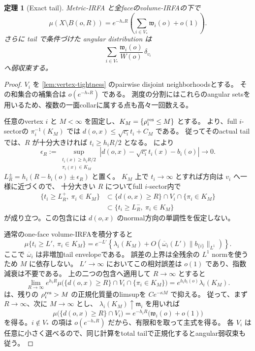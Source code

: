 \documentclass[11pt,a4paper]{ltjsarticle}
\theoremstyle{plain}
\newtheorem{theorem}{定理}[section]
\theoremstyle{definition}
\theoremstyle{remark}
\begin{document}
\begin{theorem}[Exact tail]
\label{thm:tail}
Metric-IRFA と全faceのvolume-IRFAの下で
\[
 \boxed{
 \mu(X\setminus B(o,R))
 =e^{-h_*R}\left(\sum_{i\in V_*}\mathfrak w_i(o)+o(1)\right).}
\]
さらに tail で条件づけた angular distribution は
\[
 \sum_{i\in V_*}
 \frac{\mathfrak w_i(o)}{W(o)}\,\delta_{v_i}
\]
へ弱収束する。
\end{theorem}
\begin{proof}
$V_i$ を \cref{lem:vertex-tightness} のpairwise disjoint neighborhoodsとする。
その和集合の補集合は $o(e^{-h_*R})$ である。
測度の分割にはこれらのangular setsを用いるため、複数の一面collarに属する点も高々一回数える。

任意のvertex $i$ と $M<\infty$ を固定し、$K_M=\{\rho_i^{\rm res}\le M\}$ とする。
 より、full $i$-sectorの $\pi_i^{-1}(K_M)$ では
$d(o,x)\le\sqrt{c_i}t_i+C_M$ である。
従ってそのactual tailでは、$R$ が十分大きければ $t_i\ge h_iR/2$ となる。
 により
\[
 \epsilon_R:=
 \sup_{\substack{t_i(x)\ge h_iR/2\\\pi_i(x)\in K_M}}
 \left|d(o,x)-\sqrt{c_i}t_i(x)-b_i(o)\right|
 \longrightarrow0.
\]
$L_R^\pm=h_i(R-b_i(o)\pm\epsilon_R)$ と置く。
$K_M$ 上で $t_i\to\infty$ とすれば方向は $v_i$ へ一様に近づくので、
十分大きい $R$ についてfull $i$-sector内で
\begin{align*}
 \{t_i\ge L_R^+,\ \pi_i\in K_M\}
 &\subset \{d(o,x)\ge R\}\cap V_i\cap\{\pi_i\in K_M\}\\
 &\subset \{t_i\ge L_R^-,\ \pi_i\in K_M\}
\end{align*}
が成り立つ。この包含には $d(o,x)$ のnormal方向の単調性を仮定しない。

通常のone-face volume-IRFAを積分すると
\[
 \mu\{t_i\ge L',\ \pi_i\in K_M\}
 =e^{-L'}\left\{\lambda_i(K_M)
      +O\!\left(\overline\omega_i(L')\|b_{\{i\}}\|_{L^1}\right)\right\}.
\]
ここで $\overline\omega_i$ は非増加tail envelopeである。
誤差の上界は全残余の $L^1$ normを使うため $M$ に依存しない。
$L'\to\infty$ においてこの相対誤差は $o(1)$ であり、指数減衰は不要である。
上の二つの包含へ適用して $R\to\infty$ とすると
\[
 \lim_{R\to\infty}e^{h_iR}
 \mu\bigl(\{d(o,x)\ge R\}\cap V_i\cap\{\pi_i\in K_M\}\bigr)
 =e^{h_ib_i(o)}\lambda_i(K_M).
\]
 は、残りの $\rho_i^{\rm res}>M$ の正規化質量のlimsupを
$Ce^{-\kappa M}$ で抑える。
従って、まず $R\to\infty$、次に $M\to\infty$ とし、
$\lambda_i(K_M)\uparrow\mathfrak m_i$ を用いれば
\[
 \mu\bigl(\{d(o,x)\ge R\}\cap V_i\bigr)
 =e^{-h_iR}\bigl(\mathfrak w_i(o)+o(1)\bigr)
\]
を得る。$i\notin V_*$ の項は $o(e^{-h_*R})$ だから、有限和を取って主式を得る。
各 $V_i$ は任意に小さく選べるので、同じ計算をtotal tailで正規化するとangular弱収束も従う。
\end{proof}
\end{document}
